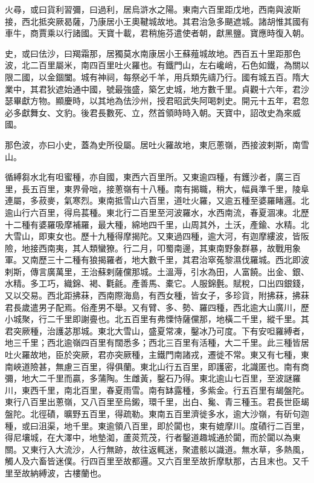 \begin{pinyinscope}
 火尋，或曰貨利習彌，曰過利，居烏滸水之陽。東南六百里距戊地，西南與波斯接，西北抵突厥曷薩，乃康居小王奧鞬城故地。其君治急多颶遮城。諸胡惟其國有車牛，商賈乘以行諸國。天寶十載，君稍施芬遣使者朝，獻黑鹽。寶應時復入朝。



 史，或曰佉沙，曰羯霜那，居獨莫水南康居小王蘇薤城故地。西百五十里距那色波，北二百里屬米，南四百里吐火羅也。有鐵門山，左右巉峭，石色如鐵，為關以限二國，以金錮闔。城有神祠，每祭必千羊，用兵類先禱乃行。國有城五百。隋大業中，其君狄遮始通中國，號最強盛，築乞史城，地方數千里。貞觀十六年，君沙瑟畢獻方物。顯慶時，以其地為佉沙州，授君昭武失阿喝刺史。開元十五年，君忽必多獻舞女、文豹。後君長數死、立，然首領時時入朝。天寶中，詔改史為來威國。



 那色波，亦曰小史，蓋為史所役屬。居吐火羅故地，東厄蔥嶺，西接波剌斯，南雪山。



 循縛芻水北有呾蜜種，亦自國，東西六百里所。又東逾四種，有鑊沙者，廣三百里，長五百里，東界骨咄，接蔥嶺有十八種。南有揭職，稍大，幅員準千里，陵阜連屬，多菽麥，氣寒烈。東南抵雪山六百里，道吐火羅，又逾五種至婆羅睹邏。北逾山行六百里，得烏萇種。東北行二百里至河波羅水，水西南流，春夏涸凍。北歷十二種有婆羅吸摩補羅，最大種，綿地四千里，山周其外，土沃，產鍮、水精。北大雪山，即東女也。歷十九種得摩揭陀。又東過四種，逾大河，有迦摩縷波，皆阪險，地接西南夷，其人類蠻獠。行二月，叩蜀南邊，其東南野象群暴，故戰用象軍。又南歷三十二種有狼揭羅者，地大數千里，其君治窣菟黎濕伐羅城。西北即波剌斯，傳言廣萬里，王治蘇剌薩儻那城。土溫溽，引水為田，人富饒。出金、銀、水精。多工巧，織錦、褐、氍毹。產善馬、橐它。人服錦氎。賦稅，口出四銀錢，又以交易。西北距拂菻，西南際海島，有西女種，皆女子，多珍貨，附拂菻，拂菻君長歲遣男子配焉。俗產男不舉。又有臂、多、勢、羅四種，西北逾大山廣川，歷小城聚，行二千里即謝亹也。北五百里有弗慄恃薩儻那，地橫二千里，縱千里。其君突厥種，治護苾那城。東北大雪山，盛夏常凍，鑿冰乃可度。下有安呾羅縛者，地三千里；西北逾嶺四百里有闊悉多；西北三百里有活種，大二千里。此三種皆居吐火羅故地，臣於突厥，君亦突厥種，主鐵門南諸戎，遷徙不常。東又有七種，東南峽道險甚，無慮三百里，得俱蘭。東北山行五百里，即護密，北識匿也。南有商彌，地大二千里而贏，多蒲陶。生雌黃，鑿石乃得。東北逾山七百里，至波謎羅川，東西千里，南北百里，春夏雨雪。南有缽露種，多紫金。行五百里有朅盤陀。東行八百里出蔥嶺，又八百里至烏鎩，環千里，出白、毚、青三種玉。君長世臣朅盤陀。北徑磧，曠野五百里，得疏勒。東南五百里濟徙多水，逾大沙嶺，有斫句迦種，或曰沮渠，地千里。東逾領八百里，即於闐也，東有媲摩川。度磧行二百里，得尼壤城，在大澤中，地墊洳，蘆菼荒茂，行者鑿道趣城通於闐，而於闐以為東關。又東行入大流沙，人行無跡，故往返輒迷，聚遣骸以識道。無水草，多熱風，觸人及六畜皆迷僕。行四百里至故都邏。又六百里至故折摩馱那，古且末也。又千里至故納縛波，古樓蘭也。




\end{pinyinscope}
